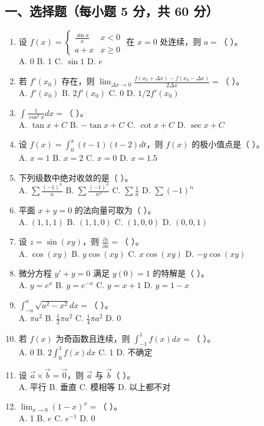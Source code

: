 \documentclass[11pt,a4paper]{article}
\begin{document}
\subsection*{一、选择题（每小题 5 分，共 60 分）}
\begin{enumerate}
    \item 设 $f(x) = \begin{cases} \frac{\sin x}{x} & x < 0 \\ a+x & x \ge 0 \end{cases}$ 在 $x=0$ 处连续，则 $a = $（ ）。 \\
    A. 0 \quad B. 1 \quad C. $\sin 1$ \quad D. $e$
    \item 若 $f'(x_0)$ 存在，则 $\lim_{\Delta x \to 0} \frac{f(x_0 + \Delta x) - f(x_0 - \Delta x)}{2\Delta x} = $（ ）。 \\
    A. $f'(x_0)$ \quad B. $2f'(x_0)$ \quad C. 0 \quad D. $1/2 f'(x_0)$
    \item $\int \frac{1}{\cos^2 x} dx = $（ ）。 \\
    A. $\tan x + C$ \quad B. $-\tan x + C$ \quad C. $\cot x + C$ \quad D. $\sec x + C$
    \item 设 $f(x) = \int_0^x (t-1)(t-2) dt$，则 $f(x)$ 的极小值点是（ ）。 \\
    A. $x=1$ \quad B. $x=2$ \quad C. $x=0$ \quad D. $x=1.5$
    \item 下列级数中绝对收敛的是（ ）。 \\
    A. $\sum \frac{(-1)^n}{n}$ \quad B. $\sum \frac{(-1)^n}{n^2}$ \quad C. $\sum \frac{1}{n}$ \quad D. $\sum (-1)^n$
    \item 平面 $x+y=0$ 的法向量可取为（ ）。 \\
    A. $(1,1,1)$ \quad B. $(1,1,0)$ \quad C. $(1,0,0)$ \quad D. $(0,0,1)$
    \item 设 $z = \sin(xy)$，则 $\frac{\partial z}{\partial x} = $（ ）。 \\
    A. $\cos(xy)$ \quad B. $y\cos(xy)$ \quad C. $x\cos(xy)$ \quad D. $-y\cos(xy)$
    \item 微分方程 $y' + y = 0$ 满足 $y(0)=1$ 的特解是（ ）。 \\
    A. $y=e^x$ \quad B. $y=e^{-x}$ \quad C. $y=x+1$ \quad D. $y=1-x$
    \item $\int_{-a}^a \sqrt{a^2-x^2} dx = $（ ）。 \\
    A. $\pi a^2$ \quad B. $\frac{1}{2} \pi a^2$ \quad C. $\frac{1}{4} \pi a^2$ \quad D. 0
    \item 若 $f(x)$ 为奇函数且连续，则 $\int_{-1}^1 f(x) dx = $（ ）。 \\
    A. 0 \quad B. $2\int_0^1 f(x) dx$ \quad C. 1 \quad D. 不确定
    \item 设 $\vec{a} \times \vec{b} = \vec{0}$，则 $\vec{a}$ 与 $\vec{b}$（ ）。 \\
    A. 平行 \quad B. 垂直 \quad C. 模相等 \quad D. 以上都不对
    \item $\lim_{x \to 0} (1-x)^x = $（ ）。 \\
    A. 1 \quad B. $e$ \quad C. $e^{-1}$ \quad D. 0
\end{enumerate}
\end{document}
